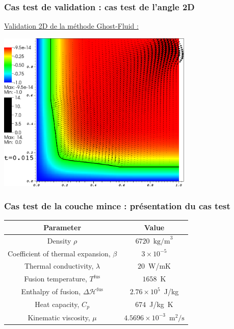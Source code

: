 \documentclass{beamer}
\newcommand{\fus}{\text{fus}}
\begin{document}
\begin{frame}
    \frametitle{Cas test de validation : cas test de l'angle 2D}
    \footnotesize
\color{cea_rouge}\underline{Validation 2D de la méthode Ghost-Fluid :}\color{cea_texte}\\
\begin{center}

\includegraphics[width=0.7\textwidth]{Figures/AngleTfusTsol_0_0150000.png}
\end{center}

\end{frame}

\begin{frame}
    \frametitle{Cas test de la couche mince : présentation du cas test}
    \footnotesize
\begin{figure}[h]
\centering
\begin{tikzpicture}[scale =0.5, every node/.style={scale=0.7}]

\end{tikzpicture}
\begin{tikzpicture}[scale =0.3, every node/.style={scale=0.4}]

\end{tikzpicture}
\label{fig:configCoucheMince}
\end{figure}


\begin{table}[!h]
	\centering
	\tiny
		\begin{tabular}{|c|c|}
		\hline
		Parameter & Value\\
		\hline \hline
		Density $\rho$ & $6720$~$\text{kg/m}^3$\\	
		Coefficient of thermal expansion, $\beta$ & $3\times 10^{-5}$\\
		Thermal conductivity, $\lambda$ & $20$~W/mK\\
		Fusion temperature, $T^\fus$ & $1658$~K\\
		Enthalpy of fusion, $\Delta \mathcal{H}^\fus$ & $2.76\times 10^5$~J/kg\\
		Heat capacity, $C_p$ & $674$~J/kg~K\\
		Kinematic viscosity, $\mu$ & $4.5696 \times 10^{-3}$~$\text{m}^2/\text{s}$\\
		\hline
		\end{tabular}%
	\label{tab:Acier}
\end{table}
\end{frame}
\end{document}

